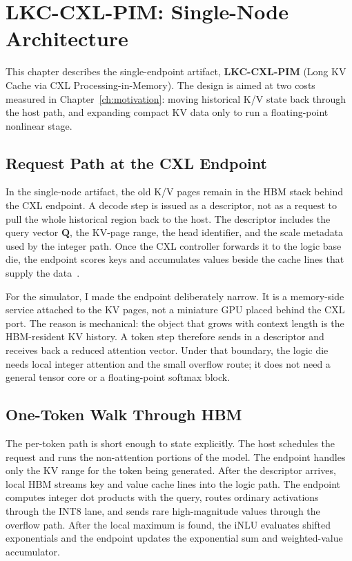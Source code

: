 \chapter{LKC-CXL-PIM: Single-Node Architecture}
\label{ch:inlu_architecture}

This chapter describes the single-endpoint artifact, \textbf{LKC-CXL-PIM} (Long KV Cache via CXL Processing-in-Memory). The design is aimed at two costs measured in Chapter~\ref{ch:motivation}: moving historical K/V state back through the host path, and expanding compact KV data only to run a floating-point nonlinear stage.

\section{Request Path at the CXL Endpoint}

In the single-node artifact, the old K/V pages remain in the HBM stack behind the CXL endpoint. A decode step is issued as a descriptor, not as a request to pull the whole historical region back to the host. The descriptor includes the query vector $\mathbf{Q}$, the KV-page range, the head identifier, and the scale metadata used by the integer path. Once the CXL controller forwards it to the logic base die, the endpoint scores keys and accumulates values beside the cache lines that supply the data~\cite{attentionlego}.

For the simulator, I made the endpoint deliberately narrow. It is a memory-side service attached to the KV pages, not a miniature GPU placed behind the CXL port. The reason is mechanical: the object that grows with context length is the HBM-resident KV history. A token step therefore sends in a descriptor and receives back a reduced attention vector. Under that boundary, the logic die needs local integer attention and the small overflow route; it does not need a general tensor core or a floating-point softmax block.

\section{One-Token Walk Through HBM}

The per-token path is short enough to state explicitly. The host schedules the request and runs the non-attention portions of the model. The endpoint handles only the KV range for the token being generated. After the descriptor arrives, local HBM streams key and value cache lines into the logic path. The endpoint computes integer dot products with the query, routes ordinary activations through the INT8 lane, and sends rare high-magnitude values through the overflow path. After the local maximum is found, the iNLU evaluates shifted exponentials and the endpoint updates the exponential sum and weighted-value accumulator.

